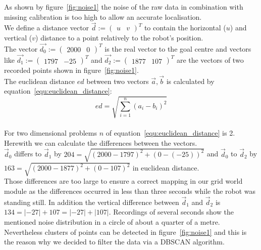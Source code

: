 \documentclass[lnicst,a4paper]{svmultln}
\begin{document}
As shown by figure~\ref{fig:noise1} the noise of the raw data in combination with missing calibration is too high to allow an accurate localisation.
\\
We define a distance vector $\vec{d} := \left( \begin{array}{cc} u & v \end{array} \right)^{T}$ to contain the horizontal ($u$) and vertical ($v$) distance to a point relatively to the robot's position. 
\\
The vector 
$\vec{d_{0}} := \left( \begin{array}{cc} 2000 & 0 \end{array} \right)^{T}$ is the real vector to the goal centre and vectors like
$\vec{d_{1}} := \left( \begin{array}{cc} 1797 & -25 \end{array} \right)^{T}$ and
$\vec{d_{2}} := \left( \begin{array}{cc} 1877 & 107 \end{array} \right)^{T}$
are the vectors of two recorded points shown in figure~\ref{fig:noise1}.
\\
The euclidean distance $ed$ between two vectors $\vec{a}, \vec{b}$ is calculated by equation~\ref{equ:euclidean_distance}:
\\
\begin{equation}
\label{equ:euclidean_distance}
ed = \sqrt{\sum_{i=1}^{n} (a_i - b_i)^2}
\end{equation}
\\
For two dimensional problems $n$ of equation~\ref{equ:euclidean_distance} is 2. Herewith we can calculate the differences between the vectors.
\\
$\vec{d}_{0}$ differs to $\vec{d}_{1}$ by
$ 204 = \sqrt{(2000 - 1797)^2 + (0 - (-25))^2}$ and 
$\vec{d}_{0}$ to $\vec{d}_{2}$
by $ 163 = \sqrt{(2000 - 1877)^2 + (0 - 107)^2}$
in euclidean distance.
\\
Those differences are too large to ensure a correct mapping in our grid world module as the differences occurred in less than three seconds while the robot was standing still. In addition the vertical difference between $\vec{d}_{1}$ and $\vec{d}_{2}$ is $ 134 = |-27| + 107 = |-27| + |107|$. Recordings of several seconds show the mentioned noise distribution in a circle of about a quarter of a metre.
\\
Nevertheless clusters of points can be detected in figure~\ref{fig:noise1} and this is the reason why we decided to filter the data via a DBSCAN algorithm.
\end{document}
